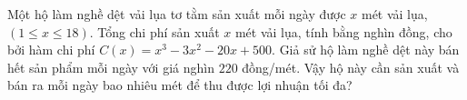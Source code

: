 \begin{bt}%
	Một hộ làm nghề dệt vải lụa tơ tằm sản xuất mỗi ngày được $x$ mét vải lụa, $(1 \le x \le 18)$. Tổng chi phí sản xuất $x$ mét vải lụa, tính bằng nghìn đồng, cho bởi hàm chi phí $C(x) = x^3 - 3x^2 - 20x +500$. Giả sử hộ làm nghề dệt này bán hết sản phẩm mỗi ngày với giá nghìn $220$ đồng/mét. Vậy hộ này cần sản xuất và bán ra mỗi ngày bao nhiêu mét để thu được lợi nhuận tối đa?
\end{bt}

